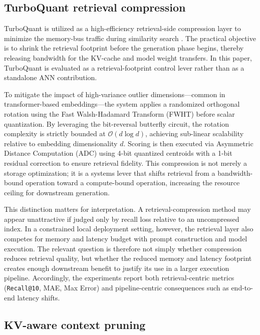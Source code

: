 \documentclass[10pt,twocolumn]{article}
\begin{document}
\subsection{TurboQuant retrieval compression}

TurboQuant is utilized as a high-efficiency retrieval-side compression layer to minimize the memory-bus traffic during similarity search \cite{zandieh2025turboquant}. The practical objective is to shrink the retrieval footprint before the generation phase begins, thereby releasing bandwidth for the KV-cache and model weight transfers. In this paper, TurboQuant is evaluated as a retrieval-footprint control lever rather than as a standalone ANN contribution.

To mitigate the impact of high-variance outlier dimensions—common in transformer-based embeddings—the system applies a randomized orthogonal rotation using the Fast Walsh-Hadamard Transform (FWHT) before scalar quantization. By leveraging the bit-reversal butterfly circuit, the rotation complexity is strictly bounded at $\mathcal{O}(d \log d)$, achieving sub-linear scalability relative to embedding dimensionality $d$. Scoring is then executed via Asymmetric Distance Computation (ADC) using 4-bit quantized centroids with a 1-bit residual correction to ensure retrieval fidelity. This compression is not merely a storage optimization; it is a systems lever that shifts retrieval from a bandwidth-bound operation toward a compute-bound operation, increasing the resource ceiling for downstream generation.

This distinction matters for interpretation. A retrieval-compression method may appear unattractive if judged only by recall loss relative to an uncompressed index. In a constrained local deployment setting, however, the retrieval layer also competes for memory and latency budget with prompt construction and model execution. The relevant question is therefore not simply whether compression reduces retrieval quality, but whether the reduced memory and latency footprint creates enough downstream benefit to justify its use in a larger execution pipeline. Accordingly, the experiments report both retrieval-centric metrics (\texttt{Recall@10}, MAE, Max Error) and pipeline-centric consequences such as end-to-end latency shifts.

\subsection{KV-aware context pruning}
\end{document}
